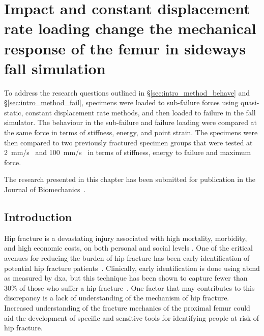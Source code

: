 \chapter{Impact and constant displacement rate loading change the mechanical response of the femur in sideways fall simulation}
\label{ch:behave_fail}
To address the research questions outlined in \S\ref{sec:intro_method_behave} and \S\ref{sec:intro_method_fail}, specimens were loaded to sub-failure forces using quasi-static, constant displacement rate methods, and then loaded to failure in the fall simulator.
The behaviour in the sub-failure and failure loading were compared at the same force in terms of stiffness, energy, and point strain.
The specimens were then compared to two previously fractured specimen groups that were tested at 2~\ac{mm}/\ac{s}~\citep{nishiyama_proximal_2013} and 100~\ac{mm}/\ac{s}~\citep{de_bakker_during_2009} in terms of stiffness, energy to failure and maximum force.

The research presented in this chapter has been submitted for publication in the Journal of Biomechanics~\citep{gilchrist_mechanics_2013}.

\section{Introduction}
Hip fracture is a devastating injury associated with high mortality, morbidity, and high economic costs, on both personal and social levels \citep{braithwaite_estimating_2003, wiktorowicz_economic_2001}.
One of the critical avenues for reducing the burden of hip fracture has been early identification of potential hip fracture patients~\citep{johnell_predictive_2005, kanis_frax_2009, van_den_bergh_assessment_2010}.
Clinically, early identification is done using \acf{abmd} as measured by \acf{dxa}, but this technique has been shown to capture fewer than 30\% of those who suffer a hip fracture~\citep{stone_bmd_2003}.
One factor that may contributes to this discrepancy is a lack of understanding of the mechanism of hip fracture.
Increased understanding of the fracture mechanics of the proximal femur could aid the development of specific and sensitive tools for identifying people at risk of hip fracture.

